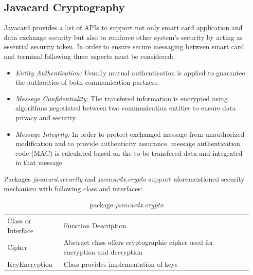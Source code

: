 \subsection{Javacard Cryptography}
Javacard provides a list of APIs to support not only smart card application and data exchange security but also to reinforce other system's security by acting as essential security token. 
In order to ensure secure messaging between smart card and terminal following three aspects must be considered:
\begin{itemize}
\item \emph{Entity Authentication:} Usually mutual authentication is applied to guarantee the authorities of both communication partners.
\item \emph{Message Confidentiality:} The transfered information is encrypted using algorithms negotiated between two communication entities to ensure data privacy and security.
\item \emph{Message Integrity:} In order to protect exchanged message from unauthorized modification and to provide authenticity assurance, message authentication code (MAC) is calculated based on the to be transfered data and integrated in that message.
\end{itemize}
Packages \emph{javacard.security} and \emph{javacardx.crypto} support aforementioned security mechanism with following class and interfaces\cite{chen}:

\begin{table}[!htbp]
\caption{package:\emph{javacardx.crypto}}
\begin{tabular}{lllll}
\hline\hline
Class or Interface & Function Description\\[0.5ex]
Cipher & \parbox[t]{10cm}{Abstract class offers cryptographic cipher used for encryption and decryption}\\
KeyEncryption & Class provides implementation of keys\\
\hline
\end{tabular}
\label{table:javacardx-crypto}
\end{table}



